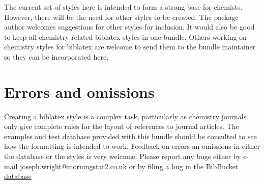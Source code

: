 \documentclass[a4paper]{article}
\begin{document}
The current set of styles here is intended to form a strong base
for chemists.  However, there will be the need for other styles
to be created. The package author welcomes suggestions for other
styles for inclusion.  It would also be good to keep all 
chemistry-related \textsf{biblatex} styles in one bundle. Others
working on chemistry styles for \textsf{biblatex} are welcome to
send them to the bundle maintainer so they can be incorporated 
here.

\section{Errors and omissions}

Creating a \textsf{biblatex} style is a complex task, 
particularly as chemistry journals only give complete rules
for the layout of references to journal articles.  The 
examples and test database provided with this bundle should be
consulted to see how the formatting is intended to work.  
Feedback on errors an omissions in either the database or the 
styles is very welcome. Please report any bugs either 
by e-mail 
\href{mailto:joseph.wright@morningstar2.co.uk}%
{joseph.wright@morningstar2.co.uk} or by filing a bug
in the 
\href{http://bitbucket.org/josephwright/biblatex-chem/issues}%
{BibBucket database}

\printbibliography
\end{document}
